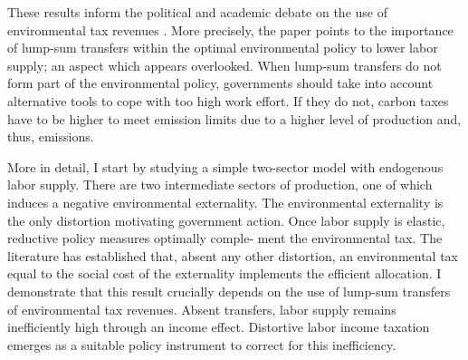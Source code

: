 These results inform the political and academic debate on the use of environmental tax revenues 
\citep[e.g.][]{Baker2017TheDividends, Fried2018TheGenerations, Carattini2018}. More precisely, the paper points to the importance of lump-sum transfers within the optimal environmental policy to lower labor supply; an aspect which appears overlooked. %
When lump-sum transfers do not form part of the environmental policy, governments should take into account alternative tools to cope with too high work effort. If they do not, carbon taxes have to be higher to meet emission limits due to a higher level of production and, thus, emissions.



More in detail, I start by studying a simple two-sector model with endogenous labor supply.  There are two intermediate sectors of production, one of which induces a negative environmental externality. The environmental externality is the only distortion motivating government action. Once 
labor supply is elastic, reductive policy measures optimally comple- ment the environmental tax. 
The literature has established that, absent any other distortion, an environmental tax equal to the social cost of the externality implements the efficient allocation. 
I demonstrate that this result crucially depends on the use of lump-sum transfers of environmental tax revenues. Absent transfers, labor supply remains inefficiently high through an income effect. Distortive labor income taxation emerges as a suitable policy instrument to correct for this inefficiency.


